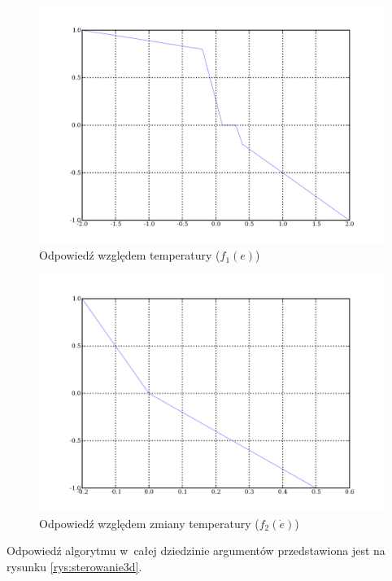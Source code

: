 
\begin{figure}[p] 
	\centering\includegraphics[width=\textwidth]{figures/t_zygzaczek}
	\caption{Odpowiedź względem temperatury ($f_1(e)$)}\label{rys:t_zygzaczek}
\end{figure}

\begin{figure}[p] 
	\centering\includegraphics[width=\textwidth]{figures/dt_zygzaczek}
	\caption{Odpowiedź względem zmiany temperatury ($f_2(\dot{e})$)}\label{rys:dt_zygzaczek}
\end{figure}

Odpowiedź algorytmu w~całej dziedzinie argumentów przedstawiona jest
na rysunku \ref{rys:sterowanie3d}.

